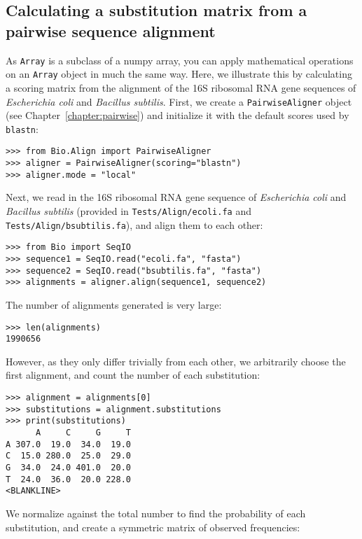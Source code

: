 \subsection{Calculating a substitution matrix from a pairwise sequence alignment}

As \verb+Array+ is a subclass of a numpy array, you can apply mathematical operations on an \verb+Array+ object in much the same way. Here, we illustrate this by calculating a scoring matrix from the alignment of the 16S ribosomal RNA gene sequences of \textit{Escherichia coli} and \textit{Bacillus subtilis}. First, we create a \verb+PairwiseAligner+ object (see Chapter~\ref{chapter:pairwise}) and initialize it with the default scores used by \verb+blastn+:

\begin{verbatim}
>>> from Bio.Align import PairwiseAligner
>>> aligner = PairwiseAligner(scoring="blastn")
>>> aligner.mode = "local"
\end{verbatim}
Next, we read in the 16S ribosomal RNA gene sequence of \textit{Escherichia coli} and \textit{Bacillus subtilis} (provided in \verb+Tests/Align/ecoli.fa+ and \verb+Tests/Align/bsubtilis.fa+), and align them to each other:

\begin{verbatim}
>>> from Bio import SeqIO
>>> sequence1 = SeqIO.read("ecoli.fa", "fasta")
>>> sequence2 = SeqIO.read("bsubtilis.fa", "fasta")
>>> alignments = aligner.align(sequence1, sequence2)
\end{verbatim}
The number of alignments generated is very large:

\begin{verbatim}
>>> len(alignments)
1990656
\end{verbatim}
However, as they only differ trivially from each other, we arbitrarily choose the first alignment, and count the number of each substitution:

\begin{verbatim}
>>> alignment = alignments[0]
>>> substitutions = alignment.substitutions
>>> print(substitutions)
      A     C     G     T
A 307.0  19.0  34.0  19.0
C  15.0 280.0  25.0  29.0
G  34.0  24.0 401.0  20.0
T  24.0  36.0  20.0 228.0
<BLANKLINE>
\end{verbatim}
We normalize against the total number to find the probability of each substitution, and create a symmetric matrix of observed frequencies:

